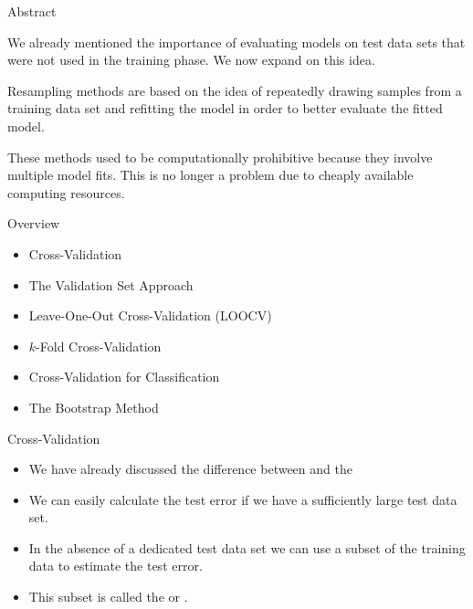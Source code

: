 \documentclass[mathserif, aspectratio=169]{beamer}
\subtitle{\bfseries%
  {Resampling Methods}\\%
  {\tiny\it Cross-Validation for Regression, Validation Set, Leave-One-Out, $k$-Fold, Cross-Validation for Classification, Bootstrap}\\%
}
\begin{document}


\begin{frame}{Abstract}
	\begin{blurb}
		We already mentioned the importance of evaluating models on test data sets that
		were not used in the training phase. We now expand on this idea.

		Resampling methods are based on the idea of repeatedly drawing samples from a training
		data set and refitting the model in order to better evaluate the fitted model.

		These methods used to be computationally prohibitive because they involve multiple
		model fits. This is no longer a problem due to cheaply available computing resources.
	\end{blurb}
\end{frame}

\begin{frame}{Overview}
	\begin{itemize}
		\item Cross-Validation
		\item The Validation Set Approach 
		\item Leave-One-Out Cross-Validation (LOOCV)
		\item $k$-Fold Cross-Validation
		\item Cross-Validation for Classification
		\item The Bootstrap Method
	\end{itemize}
\end{frame}

\begin{frame}{Cross-Validation}
	\begin{itemize}
		\item We have already discussed the difference between  
			and the 
		\item We can easily calculate the test error if we have a sufficiently large 
			test data set.
		\item In the absence of a dedicated test data set we can use a subset of the
			training data to estimate the test error.
		\item This subset is called the  or .
	\end{itemize}
\end{frame}
\end{document}
